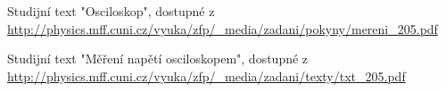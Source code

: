 \documentclass[0-protokol.tex]{subfiles}
\begin{document}
\begin{thebibliography}{}

Studijní text "Osciloskop", dostupné z\\ \url{http://physics.mff.cuni.cz/vyuka/zfp/_media/zadani/pokyny/mereni_205.pdf}

Studijní text "Měření napětí osciloskopem", dostupné z\\ \url{http://physics.mff.cuni.cz/vyuka/zfp/_media/zadani/texty/txt_205.pdf}
\begin{comment}

\bibitem{cizek_1}   %
Doc. Mgr. Jakub Čížek, PhD.: prezentace Úvod do praktické fyziky, seminář 1, dostupné z \url{http://physics.mff.cuni.cz/kfnt/vyuka/upf/seminar1.pdf}

\bibitem{cizek_9}   %
Doc. Mgr. Jakub Čížek, PhD.: prezentace Úvod do praktické fyziky, seminář 9, dostupné z \url{http://physics.mff.cuni.cz/kfnt/vyuka/upf/seminar9.pdf}

\bibitem{cizek_10}  %
Doc. Mgr. Jakub Čížek, PhD.: prezentace Úvod do praktické fyziky, seminář 10, dostupné z \url{http://physics.mff.cuni.cz/kfnt/vyuka/upf/seminar10.pdf}

\end{comment}
\end{thebibliography}
\end{document}
